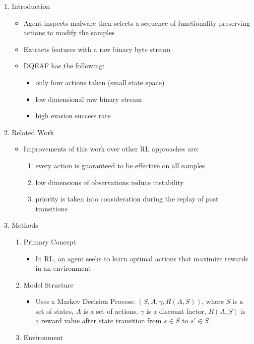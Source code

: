 \documentclass{article}
\begin{document}
\begin{enumerate}
	\item Introduction
	\begin{itemize}
		\item Agent inspects malware then selects a sequence of functionality-preserving actions to modify the samples
		\item Extracts features with a raw binary byte stream
		\item DQEAF has the following:
		\begin{itemize}
			\item only four actions taken (small state space)
			\item low dimensional raw binary stream
			\item high evasion success rate
		\end{itemize}
	\end{itemize}
	\item Related Work
	\begin{itemize}
		\item Improvements of this work over other RL approaches are:
		\begin{enumerate}
			\item every action is guaranteed to be effective on all samples
			\item low dimensions of observations reduce instability
			\item priority is taken into consideration during the replay of past transitions
		\end{enumerate}
	\end{itemize}
	\item Methods
	\begin{enumerate}
		\item Primary Concept
		\begin{itemize}
			\item In RL, an agent seeks to learn optimal actions that maximize rewards in an environment
		\end{itemize}
		\item Model Structure
		\begin{itemize}
			\item Uses a Markov Decision Process: $(S, A, \gamma, R(A, S))$, where $S$ is a set of states, $A$ is a set of actions, $\gamma$ is a discount factor, $R(A,S)$ is a reward value after state transition from $s \in S$ to $s' \in S$ 
		\end{itemize}
		\item Environment
		\begin{itemize}

\end{itemize}
\end{enumerate}
\end{enumerate}
\end{document}
